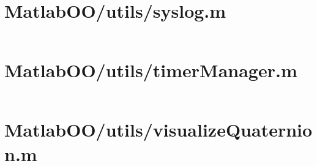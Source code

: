 \pagebreak
\section{MatlabOO/utils/syslog.m}\label{code:MatlabOO/utils/syslog.m}
\inputminted[linenos,fontsize=\scriptsize]{matlab}{/home/dcouture/git/mathyourlife/TSatPy/beta_versions/matlab_object_oriented/utils/syslog.m}

\pagebreak
\section{MatlabOO/utils/timerManager.m}\label{code:MatlabOO/utils/timerManager.m}
\inputminted[linenos,fontsize=\scriptsize]{matlab}{/home/dcouture/git/mathyourlife/TSatPy/beta_versions/matlab_object_oriented/utils/timerManager.m}

\pagebreak
\section{MatlabOO/utils/visualizeQuaternion.m}\label{code:MatlabOO/utils/visualizeQuaternion.m}
\inputminted[linenos,fontsize=\scriptsize]{matlab}{/home/dcouture/git/mathyourlife/TSatPy/beta_versions/matlab_object_oriented/utils/visualizeQuaternion.m}

